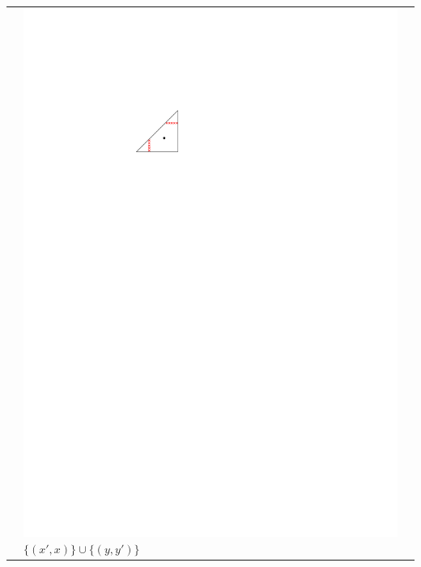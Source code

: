 \documentclass{patmorin}
\begin{document}
\begin{table}
\begin{center}
\begin{tabular}{m{1ex}|>{\centering\arraybackslash}m{}|>{\centering\arraybackslash}m{}}
         & \includegraphics[scale=.8]{figs/killersb-1} \break%
           $\{(x',x)\} \cup \{(y,y')\}$ \\ 

\end{tabular}
\end{center}
\end{table}
\end{document}
